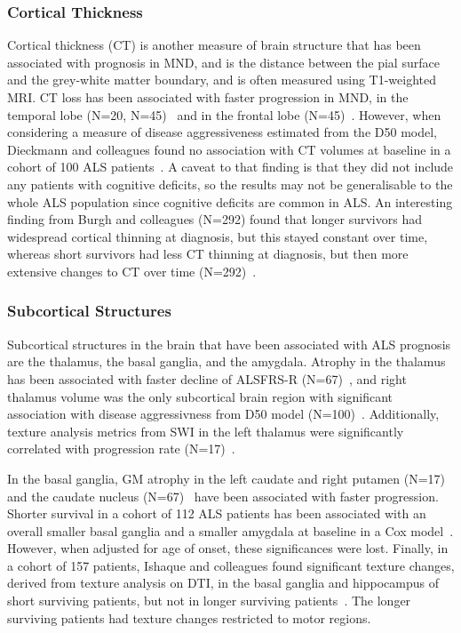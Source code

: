 \subsubsection*{Cortical Thickness}
Cortical thickness (CT) is another measure of brain structure that has been associated with prognosis in MND, and is the distance between the pial surface and the grey-white matter boundary, and is often measured using T1-weighted MRI.
CT loss has been associated with faster progression in MND, in the temporal lobe (N=20, N=45)~\cite{dambrosioFrontotemporalCorticalThinning2014, verstraeteStructuralMRIReveals2012} and in the frontal lobe (N=45)~\cite{verstraeteStructuralMRIReveals2012}.
However, when considering a measure of disease aggressiveness estimated from the D50 model, Dieckmann and colleagues found no association with CT volumes at baseline in a cohort of 100 ALS patients~\cite{dieckmannCorticalSubcorticalGrey2022}.
A caveat to that finding is that they did not include any patients with cognitive deficits, so the results may not be generalisable to the whole ALS population since cognitive deficits are common in ALS.
An interesting finding from Burgh and colleagues (N=292) found that longer survivors had widespread cortical thinning at diagnosis, but this stayed constant over time, whereas short survivors had less CT thinning at diagnosis, but then more extensive changes to CT over time (N=292)~\cite{burghMultimodalLongitudinalStudy2020}.

\subsubsection*{Subcortical Structures}
Subcortical structures in the brain that have been associated with ALS prognosis are the thalamus, the basal ganglia, and the amygdala.
Atrophy in the thalamus has been associated with faster decline of ALSFRS-R (N=67)~\cite{sendaStructuralMRICorrelates2017}, and right thalamus volume was the only subcortical brain region with significant association with disease aggressivness from D50 model (N=100)~\cite{dieckmannCorticalSubcorticalGrey2022}.
Additionally, texture analysis metrics from SWI in the left thalamus were significantly correlated with progression rate (N=17)~\cite{johnsQuantifyingChangesSusceptibility2019}.

In the basal ganglia, GM atrophy in the left caudate and right putamen (N=17)~\cite{agostaLongitudinalAssessmentGrey2009} and the caudate nucleus (N=67)~\cite{sendaStructuralMRICorrelates2017} have been associated with faster progression.
Shorter survival in a cohort of 112 ALS patients has been associated with an overall smaller basal ganglia and a smaller amygdala at baseline in a Cox model~\cite{westenengSubcorticalStructuresAmyotrophic2015}. However, when adjusted for age of onset, these significances were lost.
Finally, in a cohort of 157 patients, Ishaque and colleagues found significant texture changes, derived from texture analysis on DTI, in the basal ganglia and hippocampus of short surviving patients, but not in longer surviving patients~\cite{ishaqueEvaluatingCerebralCorrelates2018}.
The longer surviving patients had texture changes restricted to motor regions.

